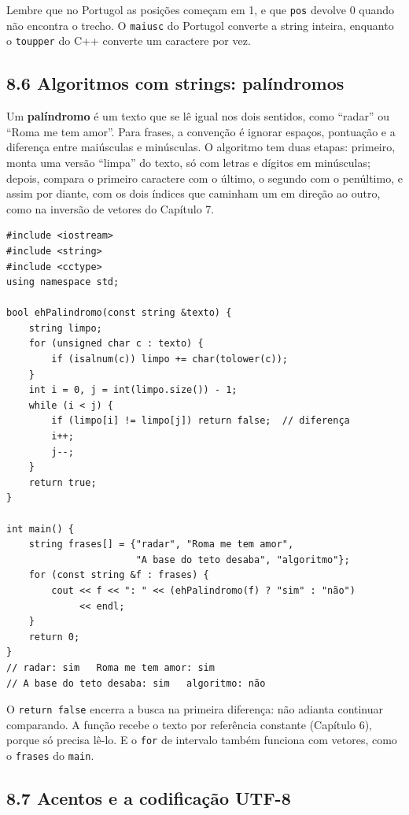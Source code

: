 Lembre que no Portugol as posições começam em 1, e que \texttt{pos} devolve 0 quando não encontra o trecho. O \texttt{maiusc} do Portugol converte a string inteira, enquanto o \texttt{toupper} do C++ converte um caractere por vez.

\subsection{8.6 Algoritmos com strings: palíndromos}

Um \textbf{palíndromo} é um texto que se lê igual nos dois sentidos, como ``radar'' ou ``Roma me tem amor''. Para frases, a convenção é ignorar espaços, pontuação e a diferença entre maiúsculas e minúsculas. O algoritmo tem duas etapas: primeiro, monta uma versão ``limpa'' do texto, só com letras e dígitos em minúsculas; depois, compara o primeiro caractere com o último, o segundo com o penúltimo, e assim por diante, com os dois índices que caminham um em direção ao outro, como na inversão de vetores do Capítulo 7.

\begin{codigo}
\begin{Verbatim}[breaklines=true, breaksymbolleft={}, fontsize=\footnotesize]
#include <iostream>
#include <string>
#include <cctype>
using namespace std;

bool ehPalindromo(const string &texto) {
    string limpo;
    for (unsigned char c : texto) {
        if (isalnum(c)) limpo += char(tolower(c));
    }
    int i = 0, j = int(limpo.size()) - 1;
    while (i < j) {
        if (limpo[i] != limpo[j]) return false;  // diferença
        i++;
        j--;
    }
    return true;
}

int main() {
    string frases[] = {"radar", "Roma me tem amor",
                       "A base do teto desaba", "algoritmo"};
    for (const string &f : frases) {
        cout << f << ": " << (ehPalindromo(f) ? "sim" : "não")
             << endl;
    }
    return 0;
}
// radar: sim   Roma me tem amor: sim
// A base do teto desaba: sim   algoritmo: não
\end{Verbatim}
\end{codigo}

O \texttt{return false} encerra a busca na primeira diferença: não adianta continuar comparando. A função recebe o texto por referência constante (Capítulo 6), porque só precisa lê-lo. E o \texttt{for} de intervalo também funciona com vetores, como o \texttt{frases} do \texttt{main}.

\subsection{8.7 Acentos e a codificação UTF-8}

